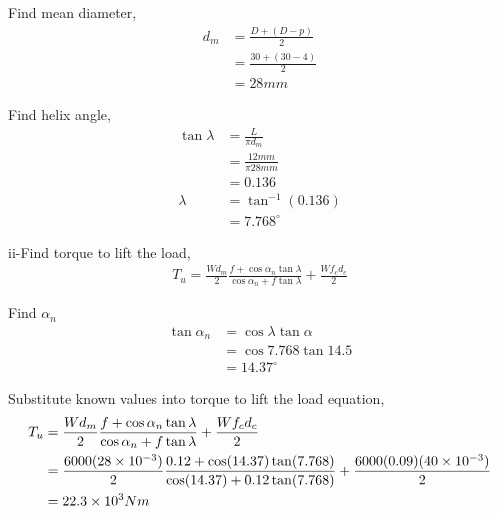 \documentclass[a4paper, fleqn]{article}
\providecommand{\sci}[1]{\protect\ensuremath{\times 10^{\StrSubstitute[0]{#1}{e}{}}}}
\begin{document}
Find mean diameter,
\begin{equation*}
    \begin{aligned}
    d_m &= \frac {D+(D-p)}{2}\\  
    &= \frac {30+(30-4)}{2}\\ 
    &= 28mm
    \end{aligned}
\end{equation*}

Find helix angle,
\begin{equation*}
    \begin{aligned}
    \tan\lambda &= \frac{L}{\pi d_m}\\
    &= \frac{12mm}{\pi 28mm} \\
    &=0.136\\
    \lambda &= \tan^{-1}(0.136)\\
    &=7.768^{\circ}
    \end{aligned}
\end{equation*}

ii-Find torque to lift the load,
\begin{equation*}
    \begin{aligned}
    T_u = \frac{Wd_m}{2} \frac{f+\cos\alpha_n \tan\lambda}{\cos\alpha_n + f\tan\lambda} + \frac{Wf_c d_c}{2}
    \end{aligned}
\end{equation*}

Find $\alpha_n$
\begin{equation*}
    \begin{aligned}
    \tan \alpha_n &= \cos \lambda \tan \alpha\\
     &= \cos 7.768 \tan 14.5\\
    &= 14.37^{\circ}
    \end{aligned}
\end{equation*}

Substitute known values into torque to lift the load equation,
\begin{equation*}
    \begin{aligned}
    T_u &= \frac{Wd_m}{2} \frac{f+\cos\alpha_n \tan\lambda}{\cos\alpha_n + f\tan\lambda} + \frac{Wf_c d_c}{2} \\
    &= \frac{6000(28\sci{e-3})}{2} \frac{0.12+\cos(14.37) \tan(7.768)}{\cos(14.37) + 0.12\tan(7.768)} + \frac{6000(0.09)(40\sci{e-3})}{2} \\
    &= 22.3 \sci{e3} Nm
    \end{aligned}
\end{equation*}
\end{document}
